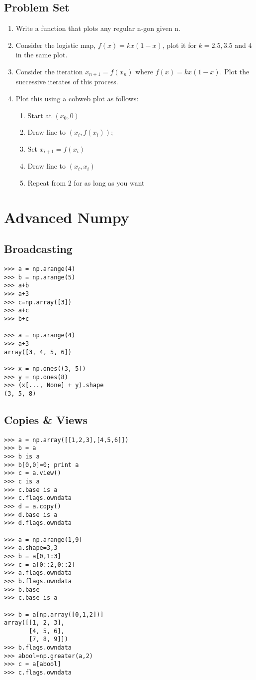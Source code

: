 \documentclass[12pt]{article}
\begin{document}
\subsection{Problem Set}
  \begin{enumerate}
    \item Write a function that plots any regular n-gon given n.
    \item Consider the logistic map, $f(x) = kx(1-x)$, plot it for
          $k=2.5, 3.5$ and $4$ in the same plot.

  \item Consider the iteration $x_{n+1} = f(x_n)$ where $f(x) =
        kx(1-x)$.  Plot the successive iterates of this process.
  \item Plot this using a cobweb plot as follows:
  \begin{enumerate}
    \item Start at $(x_0, 0)$
    \item Draw line to $(x_i, f(x_i))$; 
    \item Set $x_{i+1} = f(x_i)$
    \item Draw line to $(x_i, x_i)$
    \item Repeat from 2 for as long as you want 
  \end{enumerate}
\end{enumerate}

\section{Advanced Numpy}

\subsection{Broadcasting}
\begin{verbatim}
>>> a = np.arange(4)
>>> b = np.arange(5)
>>> a+b
>>> a+3
>>> c=np.array([3])
>>> a+c
>>> b+c

>>> a = np.arange(4)
>>> a+3
array([3, 4, 5, 6])

>>> x = np.ones((3, 5))
>>> y = np.ones(8)
>>> (x[..., None] + y).shape
(3, 5, 8)

\end{verbatim}

\subsection{Copies \& Views}
\begin{verbatim}
>>> a = np.array([[1,2,3],[4,5,6]])
>>> b = a
>>> b is a
>>> b[0,0]=0; print a
>>> c = a.view()
>>> c is a
>>> c.base is a
>>> c.flags.owndata
>>> d = a.copy()
>>> d.base is a
>>> d.flags.owndata

>>> a = np.arange(1,9)
>>> a.shape=3,3
>>> b = a[0,1:3]
>>> c = a[0::2,0::2]
>>> a.flags.owndata
>>> b.flags.owndata
>>> b.base
>>> c.base is a

>>> b = a[np.array([0,1,2])]
array([[1, 2, 3],
       [4, 5, 6],
       [7, 8, 9]])
>>> b.flags.owndata
>>> abool=np.greater(a,2)
>>> c = a[abool]
>>> c.flags.owndata

\end{verbatim}
\end{document}
